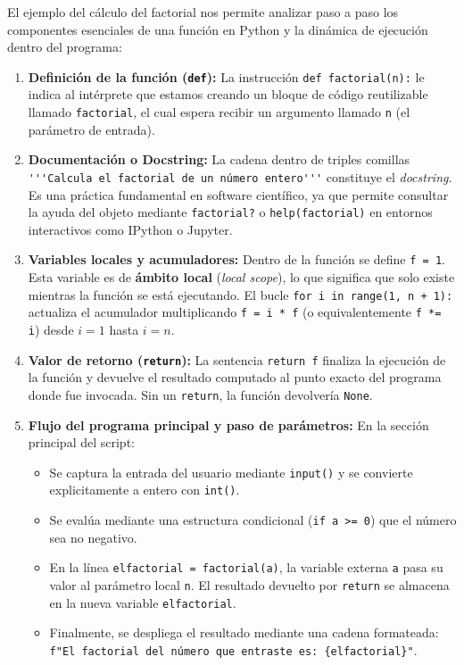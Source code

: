 \documentclass[12pt]{article}
\begin{document}
El ejemplo del cálculo del factorial nos permite analizar paso a paso los componentes esenciales 
de una función en Python y la dinámica de ejecución dentro del programa:

\begin{enumerate}
    \item \textbf{Definición de la función (\lstinline|def|):} 
    La instrucción \lstinline|def factorial(n):| le indica al intérprete que estamos creando un bloque de código reutilizable llamado \lstinline|factorial|, el cual espera recibir un argumento llamado \lstinline|n| (el parámetro de entrada).

    \item \textbf{Documentación o Docstring:} 
    La cadena dentro de triples comillas \lstinline|'''Calcula el factorial de un número entero'''| constituye el \textit{docstring}. Es una práctica fundamental en software científico, ya que permite consultar la ayuda del objeto mediante \lstinline|factorial?| o \lstinline|help(factorial)| en entornos interactivos como IPython o Jupyter.

    \item \textbf{Variables locales y acumuladores:} 
    Dentro de la función se define \lstinline|f = 1|. Esta variable es de \textbf{ámbito local} (\textit{local scope}), lo que significa que solo existe mientras la función se está ejecutando. El bucle \lstinline|for i in range(1, n + 1):| actualiza el acumulador multiplicando \lstinline|f = i * f| (o equivalentemente \lstinline|f *= i|) desde $i = 1$ hasta $i = n$.

    \item \textbf{Valor de retorno (\lstinline|return|):} 
    La sentencia \lstinline|return f| finaliza la ejecución de la función y devuelve el resultado computado al punto exacto del programa donde fue invocada. Sin un \lstinline|return|, la función devolvería \lstinline|None|.

    \item \textbf{Flujo del programa principal y paso de parámetros:} 
    En la sección principal del script:
    \begin{itemize}
        \item Se captura la entrada del usuario mediante \lstinline|input()| y se convierte explicitamente a entero con \lstinline|int()|.
        \item Se evalúa mediante una estructura condicional (\lstinline|if a >= 0|) que el número sea no negativo.
        \item En la línea \lstinline|elfactorial = factorial(a)|, la variable externa \lstinline|a| pasa su valor al parámetro local \lstinline|n|. El resultado devuelto por \lstinline|return| se almacena en la nueva variable \lstinline|elfactorial|.
        \item Finalmente, se despliega el resultado mediante una 
        cadena formateada: \lstinline|f"El factorial del número que entraste es: {elfactorial}"|.
    \end{itemize}
\end{enumerate}
\end{document}
